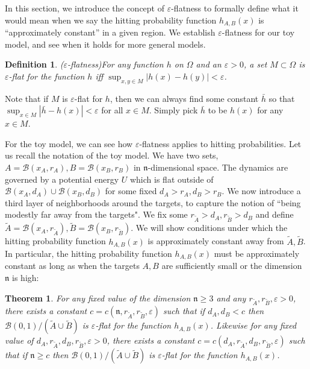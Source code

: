 \documentclass[english, aip, jcp, priprint, graphicx,floatfix]{revtex4-1}
\newtheorem{definition}{Definition}
\newtheorem{theorem}{Theorem}
\theoremstyle{plain}
\theoremstyle{definition}
\theoremstyle{plain}
\newcommand{\dimension}{{\mathfrak{n}}}
\newcommand{\bb}[1]{\mathcal{B}\left(#1\right)}
\begin{document}
In this section, we introduce the concept of $\varepsilon$-flatness to formally define what it would mean when we say the hitting probability function $h_{A, B}(x)$ is ``approximately constant'' in a given region. We establish $\varepsilon$-flatness for our toy model, and see when it holds for more general models.
%
\begin{definition}($\varepsilon$-flatness)\label{def:epsilon_flat}
For any function $h$ on $\Omega$ and an $\varepsilon > 0$, a set $M\subset \Omega$ is $\varepsilon$-flat for the function $h$ iff $\sup_{x, y \in M} | h (x) - h (y) | < \varepsilon$.
\end{definition}
%
Note that if $M$ is $\varepsilon$-flat for $h$, then we can always find some constant $\bar h$ so that $\sup_{x \in M}|\bar h-h(x)|<\varepsilon$ for all $x\in M$.  Simply pick $\bar h$ to be $h(x)$ for any $x\in M$.  

For the toy model, we can see how  $\varepsilon$-flatness applies to hitting probabilities.  Let us recall the notation of the toy model.  We have two sets, $A=\bb{x_A,r_A},B=\bb{x_B,r_B}$ in $\dimension$-dimensional space.  The dynamics are governed by a potential energy $U$ which is flat outside of $\bb{x_A,d_A}\cup\bb{x_B,d_B}$ for some fixed $d_A>r_A,d_B>r_B$.  We now introduce a third layer of neighborhoods around the targets, to capture the notion of ``being modestly far away from the targets".  We fix some $r_{\tilde A}>d_A,r_{\tilde B}>d_B$ and define $\tilde A=\bb{x_A,r_{\tilde A}},\tilde B=\bb{x_B,r_{\tilde B}}$.  We will show conditions under which the hitting probability function $h_{A, B}(x)$ is approximately constant away from $\tilde A,\tilde B$.  In particular, the hitting probability function $h_{A, B}(x)$ must be approximately constant as long as when the targets $A, B$ are sufficiently small or the dimension $\dimension$ is high:

\begin{theorem}\label{thm:epsilon_flat}
For any fixed value of the dimension $\dimension \geq 3$ and any $r_{\tilde{A}}, r_{\tilde{B}}, \varepsilon > 0$, there exists a constant $c=c(\dimension, r_{\tilde{A}}, r_{\tilde{B}}, \varepsilon)$ such that if $d_{A}, d_{B} < c$ then $\bb {0, 1} / (\tilde{A} \cup \tilde{B})$ is $\varepsilon$-flat for the function $h_{A,B}(x)$.  Likewise for any fixed value of $d_{A}, r_{\tilde{A}}, d_{B}, r_{\tilde{B}}, \varepsilon>0$, there exists a constant $c=c(d_{A}, r_{\tilde{A}}, d_{B}, r_{\tilde{B}}, \varepsilon)$ such that if $\dimension \geq c$ then $\bb {0, 1} / (\tilde{A} \cup \tilde{B})$ is $\varepsilon$-flat for the function $h_{A,B}(x)$.
\end{theorem}
\end{document}
